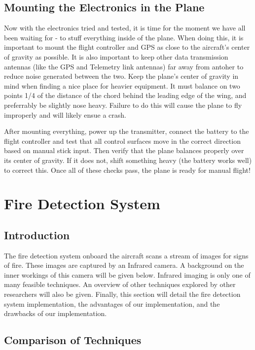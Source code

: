 \documentclass[12pt,journal,compsoc]{IEEEtran}
\begin{document}
\subsection{Mounting the Electronics in the Plane}
Now with the electronics tried and tested, it is time for the moment we have all been waiting for - to stuff everything inside of the plane. When doing this, it is important to mount the flight controller and GPS as close to the aircraft's center of gravity as possible. It is also important to keep other data transmission antennas (like the GPS and Telemetry link antennas) far away from antoher to reduce noise generated between the two. Keep the plane's center of gravity in mind when finding a nice place for heavier equipment. It must balance on two points 1/4 of the distance of the chord behind the leading edge of the wing, and preferrably be slightly nose heavy. Failure to do this will cause the plane to fly improperly and will likely ensue a crash.

After mounting everything, power up the transmitter, connect the battery to the flight controller and test that all control surfaces move in the correct direction based on manual stick input. Then verify that the plane balances properly over its center of gravity. If it does not, shift something heavy (the battery works well) to correct this. Once all of these checks pass, the plane is ready for manual flight!

\section{Fire Detection System}

\subsection{Introduction}
The fire detection system onboard the aircraft scans a stream of images for signs of fire. These images are captured by an Infrared camera. A background on the inner workings of this camera will be given below. Infrared imaging is only one of many feasible techniques. An overview of other techniques explored by other researchers will also be given. Finally, this section will detail the fire detection system implementation, the advantages of our implementation, and the drawbacks of our implementation. 

\subsection{Comparison of Techniques} \label{fire_comparison_section}
\end{document}
